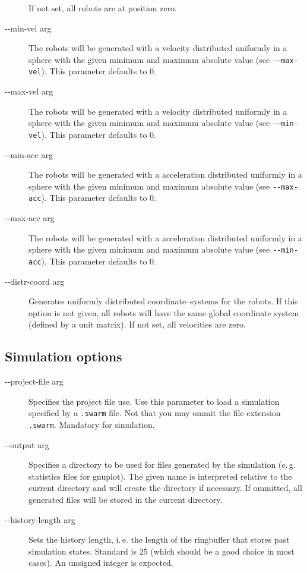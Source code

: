 \documentclass[a4paper,halfparskip,11pt,twoside]{scrartcl}
\newcommand{\gnuplot}{ {\sffamily gnuplot}\xspace}
\begin{document}
\begin{description}
 If not set, all robots are at position zero.
	\item [-{}-min-vel arg] The robots will be generated with a velocity distributed uniformly in a sphere with the given minimum and maximum absolute value (see {\tt -{}---max-vel}). This parameter defaults to 0.
	\item [-{}-max-vel arg] The robots will be generated with a velocity distributed uniformly in a sphere with the given minimum and maximum absolute value (see {\tt -{}---min-vel}). This parameter defaults to 0.
	\item [-{}-min-acc arg] The robots will be generated with a acceleration distributed uniformly in a sphere with the given minimum and maximum absolute value (see {\tt -{}-max-acc}). This parameter defaults to 0.
	\item [-{}-max-acc arg] The robots will be generated with a acceleration distributed uniformly in a sphere with the given minimum and maximum absolute value (see {\tt -{}-min-acc}). This parameter defaults to 0.
	\item [-{}-distr-coord arg] Generates uniformly distributed coordinate--systems for the robots. If this option is not given, all robots will have the same global coordinate system (defined by a unit matrix).
 If not set, all velocities are zero.
\end{description}

\subsection{Simulation options}
\begin{description}
	\item [-{}-project-file arg] Specifies the project file use. Use this parameter to load a simulation specified by a {\tt .swarm} file. Not that you may ommit the file extension {\tt .swarm}. Mandatory for simulation.
	\item [-{}-output arg] Specifies a directory to be used for files generated by the simulation (e.\,g. statistics files for \gnuplot). The given name is interpreted relative to the current directory and will create the directory if necessary. If ommitted, all generated files will be stored in the current directory.
	\item [-{}-history-length arg] Sets the history length, i.\,e. the length of the ringbuffer that stores past simulation states. Standard is 25 (which should be a good choice in most cases). An unsigned integer is expected.
\end{description}
\end{document}
